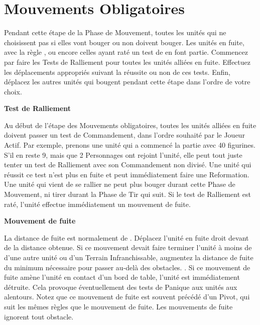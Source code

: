 \newpage
\section{Mouvements Obligatoires}

Pendant cette étape de la Phase de Mouvement, toutes les unités qui ne choisissent pas si elles vont bouger ou non doivent bouger. Les unités en fuite, avec la règle \randommovement{}, ou encore celles ayant raté un test de \stupidity{} en font partie. Commencez par faire les Tests de Ralliement pour toutes les unités alliées en fuite. Effectuez les déplacements appropriés suivant la réussite ou non de ces tests. Enfin, déplacez les autres unités qui bougent pendant cette étape dans l'ordre de votre choix.

\noindent\textbf{Test de Ralliement}

Au début de l'étape des Mouvements obligatoires, toutes les unités alliées en fuite doivent passer un test de Commandement, dans l'ordre souhaité par le Joueur Actif.  Par exemple, prenons une unité qui a commencé la partie avec 40 figurines. S'il en reste 9, mais que 2 Personnages ont rejoint l'unité, elle peut tout juste tenter un test de Ralliement avec son Commandement non divisé. Une unité qui réussit ce test n'est plus en fuite et peut immédiatement faire une Reformation. Une unité qui vient de se rallier ne peut plus bouger durant cette Phase de Mouvement, ni tirer durant la Phase de Tir qui suit. Si le test de Ralliement est raté, l'unité effectue immédiatement un mouvement de fuite.

\noindent\textbf{Mouvement de fuite}

La distance de fuite est normalement de . Déplacez l'unité en fuite droit devant de la distance obtenue. Si ce mouvement devait faire terminer l'unité à moins de  d'une autre unité ou d'un Terrain Infranchissable, augmentez la distance de fuite du minimum nécessaire pour passer au-delà des obstacles. . Si ce mouvement de fuite amène l'unité en contact d'un bord de table, l'unité est immédiatement détruite. Cela provoque éventuellement des tests de Panique aux unités aux alentours. Notez que ce mouvement de fuite est souvent précédé d'un Pivot, qui suit les mêmes règles que le mouvement de fuite. Les mouvements de fuite ignorent tout obstacle.

